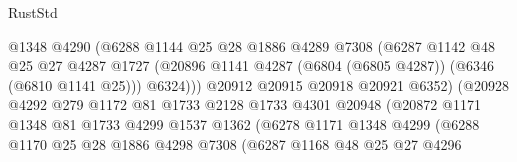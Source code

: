 \begin{lexlean}{RustStd}
\begin{coremodule}
                                  @1348
                                  @4290
                                  (@6288
                                    @1144
                                    @25
                                    @28
                                    @1886
                                    @4289
                                    @7308
                                    (@6287
                                      @1142
                                      @48
                                      @25
                                      @27
                                      @4287
                                      @1727
                                      (@20896
                                        @1141
                                        @4287
                                        (@6804 (@6805 @4287))
                                        (@6346 (@6810 @1141 @25)))
                                      @6324)))
                                @20912
                                @20915
                                @20918
                                @20921
                                @6352)
                              (@20928
                                @4292
                                @279
                                @1172
                                @81
                                @1733
                                @2128
                                @1733
                                @4301
                                @20948
                                (@20872
                                  @1171
                                  @1348
                                  @81
                                  @1733
                                  @4299
                                  @1537
                                  @1362
                                  (@6278
                                    @1171
                                    @1348
                                    @4299
                                    (@6288
                                      @1170
                                      @25
                                      @28
                                      @1886
                                      @4298
                                      @7308
                                      (@6287
                                        @1168
                                        @48
                                        @25
                                        @27
                                        @4296

\end{coremodule}
\end{lexlean}
